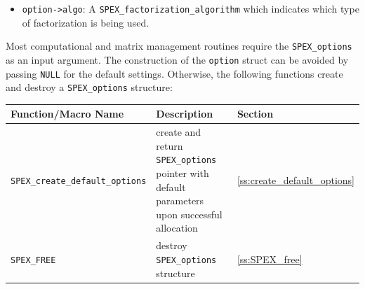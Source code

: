 \documentclass[12pt,oneside]{book}
\theoremstyle{definition}
\newenvironment{SizedCenteredTabular}[2][\small]
    {   
        #1\begin{center}\begin{tabular}{#2}
    }{ 
        \end{tabular}\end{center}
    }
\begin{document}
\begin{itemize}
    \begin{itemize}
        \item \verb|MPFR_RNDN|: Round to nearest (roundTiesToEven in IEEE 754-2008)
        \item \verb|MPFR_RNDZ|: Round toward zero (roundTowardZero in IEEE 754-2008)
        \item \verb|MPFR_RNDU|: Round toward plus infinity (roundTowardPositive in IEEE 754-2008)
        \item \verb|MPFR_RNDD|: Round toward minus infinity (roundTowardNegative in IEEE 754-2008)
        \item \verb|MPFR_RNDA|: Round away from zero 
        \item \verb|MPFR_RNDF|: Faithful rounding. This is not stable.
    \end{itemize}

    \noindent Refer to the MPFR User Guide available at \url{https://www.mpfr.org/mpfr-current/mpfr.pdf} for details on the MPFR rounding style and any other utilized MPFR convention. Default value: \verb|MPFR_RNDN|.

    \item \verb|option->algo|: A \verb|SPEX_factorization_algorithm| which indicates which type of factorization is being used.
\end{itemize}

Most computational and matrix management routines require the \verb|SPEX_options| as an input argument. The construction of the \verb|option| struct can be avoided by passing \verb|NULL| for the default settings.  Otherwise, the following functions create and destroy a \verb|SPEX_options| structure:

\begin{SizedCenteredTabular}{lp{2.5in}l} \hline
    Function/Macro Name & Description & Section \\ \hline
    \verb|SPEX_create_default_options|  
        & create and return \verb|SPEX_options| pointer with default parameters upon successful allocation
        & \ref{ss:create_default_options} \\ \hline
    \verb|SPEX_FREE|
        & destroy \verb|SPEX_options| structure
        & \ref{ss:SPEX_free} \\ \hline
\end{SizedCenteredTabular}


\end{document}

